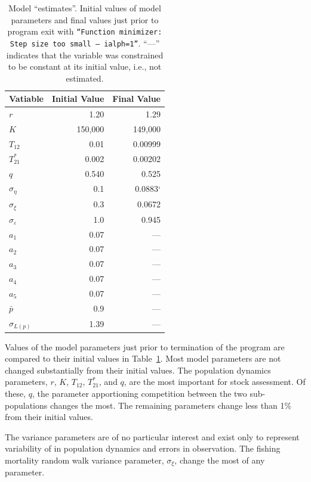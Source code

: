 \documentclass[12pt,letterpaper,twoside]{article}
\newcommand\help[1]{\color{Magenta}{\it #1 }\normalcolor}
\begin{document}
\begin{table}
\caption{\label{tab:testrun}
Model ``estimates''. Initial values of model parameters and
final values just prior to program exit with 
{\tt ``Function minimizer: Step size  too small -- ialph=1''}. 
``---'' indicates that the variable was constrained to be constant at
its initial value, i.e., not estimated.
\help{!`CHECK THESE VALUES!}
}
\begin{center}
\begin{tabular}{lrr}
\hline
Vatiable & Initial Value & Final Value\\
\hline
\hline
$r$ & 1.20&  1.29\\
$K$ & 150,000 & 149,000 \\
$T_{12}$ & 0.01 & 0.00999\\
$T^*_{21}$& 0.002 & 0.00202\\
$q$ & 0.540 & 0.525\\
\hline
$\sigma_\eta$ & 0.1 & 0.0883`\\
$\sigma_\xi$ & 0.3 & 0.0672\\
$\sigma_\varepsilon$ & 1.0 & 0.945\\
$a_1$ & 0.07 & ---\\
$a_2$ & 0.07 & ---\\
$a_3$ & 0.07 & ---\\
$a_4$ & 0.07 & ---\\
$a_5$ & 0.07 & ---\\
\hline
$\bar{p}$ & 0.9 & ---\\
$\sigma_{L(p)}$ & 1.39 & ---\\
\hline
\end{tabular}
\end{center}
\end{table}

Values of the model parameters just prior to termination of the
program are compared to their initial values in
Table~\ref{tab:testrun}.
Most model parameters are not changed substantially from their initial
values.
The population dynamics parameters, 
$r$, $K$, $T_{12}$, $T^*_{21}$, and $q$, are the most important for 
stock assessment. 
Of these, $q$, the
parameter apportioning competition between the two sub-populations
changes the most. The remaining parameters
change less than 1\% from their initial values.

The variance parameters are of no particular interest and exist only
to represent variability of in population dynamics and errors in
observation. 
The fishing mortality random walk variance parameter,
$\sigma_\xi$, change the most of any parameter.
\end{document}
